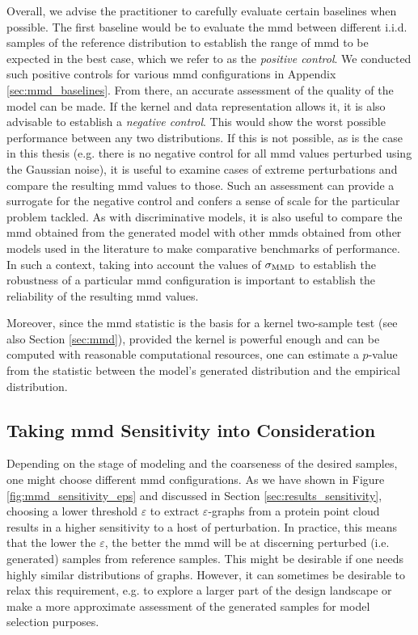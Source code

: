 Overall, we advise the practitioner to carefully evaluate certain baselines when
possible. The first baseline would be to evaluate the \gls{mmd} between
different i.i.d. samples of the reference distribution to establish the range of
\gls{mmd} to be expected in the best case, which we refer to as the
\emph{positive control}. We conducted such positive controls for various \gls{mmd}
configurations in Appendix \ref{sec:mmd_baselines}. From there, an accurate
assessment of the quality of the model can be made. If the kernel and data
representation allows it, it is also advisable to establish a \emph{negative
control}. This would show the worst possible performance between any two
distributions. If this is not possible, as is the case in this thesis (e.g.
there is no negative control for all \gls{mmd} values perturbed using the
Gaussian noise), it is useful to examine cases of extreme perturbations and
compare the resulting \gls{mmd} values to those. Such an assessment can
provide a surrogate for the negative control and confers a sense of scale for
the particular problem tackled. As with discriminative models, it is also useful
to compare the \gls{mmd} obtained from the generated model with other \gls{mmd}s obtained
from other models used in the literature to make comparative benchmarks of
performance. In such a context, taking into account the values of $\sigma_{\text{MMD}}$
to establish the robustness of a particular \gls{mmd} configuration is important to
establish the reliability of the resulting \gls{mmd} values.

Moreover, since the \gls{mmd} statistic is the basis for a kernel
two-sample test \citep{gretton2012kernel} (see also Section \ref{sec:mmd}),
provided the kernel is powerful enough and can be computed with reasonable
computational resources, one can estimate a $p$-value from the statistic between
the model's generated distribution and the empirical distribution.

\subsection{Taking \gls{mmd} Sensitivity into Consideration}\label{sec:discussion_right_mmd}
Depending on the stage of modeling and the coarseness of the desired samples,
one might choose different \gls{mmd} configurations. As we have shown in Figure
\ref{fig:mmd_sensitivity_eps} and discussed in Section
\ref{sec:results_sensitivity}, choosing a lower threshold $\varepsilon$ to
extract $\varepsilon$-graphs from a protein point cloud results in a higher
sensitivity to a host of perturbation. In practice, this means that the lower the
$\varepsilon$, the better the \gls{mmd} will be at discerning perturbed (i.e.
generated) samples from reference samples. This might be desirable if one needs
highly similar distributions of graphs. However, it can sometimes be desirable
to relax this requirement, e.g. to explore a larger part of the design landscape
or make a more approximate assessment of the generated samples for model selection purposes.

